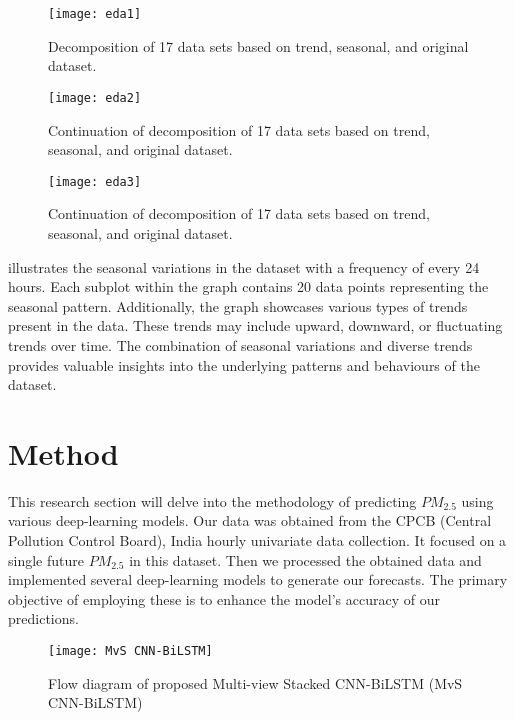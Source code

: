 \begin{itemize}
\begin{figure*}
  \centering
  \texttt{[image: eda1]}
  \caption{Decomposition of 17 data sets based on trend, seasonal, and original dataset.}
  \label{eda1}
\end{figure*}


\begin{figure*}
  \centering
  \texttt{[image: eda2]}
  \caption{Continuation of decomposition of 17 data sets based on trend, seasonal, and original dataset.}
  \label{eda2}
\end{figure*}


\begin{figure*}
  \centering
  \texttt{[image: eda3]}
  \caption{Continuation of decomposition of 17 data sets based on trend, seasonal, and original dataset.}
  \label{eda3}
\end{figure*}




\par {} illustrates the seasonal variations in the dataset with a frequency of every 24 hours. Each subplot within the graph contains 20 data points representing the seasonal pattern. Additionally,  the graph showcases various types of trends present in the data. These trends may include upward, downward,  or fluctuating trends over time. The combination of seasonal variations and diverse trends provides valuable insights into the underlying patterns and behaviours of the dataset.
\end{itemize}

\section{Method}
This research section will delve into the methodology of predicting $PM_{2.5}$ using various deep-learning models. Our data was obtained from the  CPCB (Central Pollution Control Board), India \cite{bhawan2020central} hourly univariate data collection. It focused on a single future $PM_{2.5}$ in this dataset. Then we processed the obtained data and implemented several deep-learning models to generate our forecasts. The primary objective of employing these is to enhance the model's accuracy of our predictions. 
\begin{figure*}[h!]
	\centering
		\texttt{[image: MvS CNN-BiLSTM]}
	  \caption{Flow diagram of proposed Multi-view Stacked CNN-BiLSTM (MvS CNN-BiLSTM)}\label{Muticbilstm}
\end{figure*}
